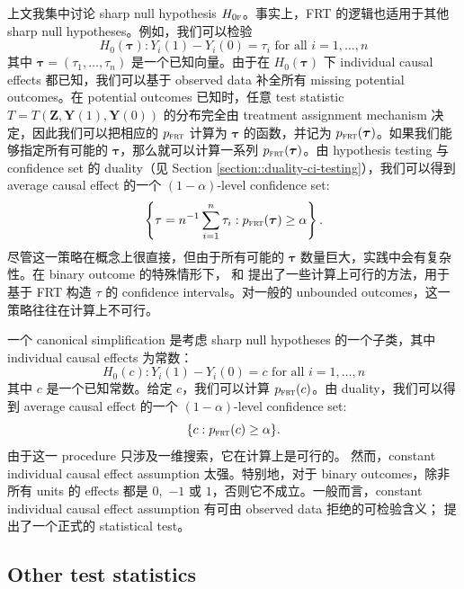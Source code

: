 上文我集中讨论 sharp null hypothesis $H_{0\textsc{f}}$。事实上，FRT 的逻辑也适用于其他 sharp null hypotheses。例如，我们可以检验
$$
H_0(\boldsymbol{\tau}): Y_i(1) - Y_i(0) = \tau_i \text{ for all } i=1,\ldots, n
$$
其中 $\boldsymbol{\tau} = (\tau_1, \ldots, \tau_n)$ 是一个已知向量。由于在 $H_0(\boldsymbol{\tau})$ 下 individual causal effects 都已知，我们可以基于 observed data 补全所有 missing potential outcomes。在 potential outcomes 已知时，任意 test statistic $T = T(\boldsymbol{Z}, \boldsymbol{Y}(1), \boldsymbol{Y}(0))$ 的分布完全由 treatment assignment mechanism 决定，因此我们可以把相应的 $p_{\textsc{frt}}$ 计算为 $\boldsymbol{\tau} $ 的函数，并记为 $p_{\textsc{frt}}(\boldsymbol{\tau} )$。如果我们能够指定所有可能的 $\boldsymbol{\tau}$，那么就可以计算一系列 $p_{\textsc{frt}}(\boldsymbol{\tau} )$。由 hypothesis testing 与 confidence set 的 duality（见 Section \ref{section::duality-ci-testing}），我们可以得到 average causal effect 的一个 $(1-\alpha)$-level confidence set:
$$
\left \{ \tau = n^{-1}\sum_{i=1}^n \tau_i :  p_{\textsc{frt}}(\boldsymbol{\tau} ) \geq \alpha \right \} .
$$
尽管这一策略在概念上很直接，但由于所有可能的 $\boldsymbol{\tau}$ 数量巨大，实践中会有复杂性。在 binary outcome 的特殊情形下，\citet{Rigdon:2015} 和 \citet{li2016exact} 提出了一些计算上可行的方法，用于基于 FRT 构造 $\tau$ 的 confidence intervals。对一般的 unbounded outcomes，这一策略往往在计算上不可行。


一个 canonical simplification \citep{rosenbaum2002design, Rosenbaum:2010} 是考虑 sharp null hypotheses 的一个子类，其中 individual causal effects 为常数：
$$
H_0(c): Y_i(1) - Y_i(0) =  c\text{ for all } i=1,\ldots, n
$$
其中 $c$ 是一个已知常数。给定 $c$，我们可以计算 $p_{\textsc{frt}}(c)$。由 duality，我们可以得到 average causal effect 的一个 $(1-\alpha)$-level confidence set:
$$
\{ c :  p_{\textsc{frt}}(c ) \geq \alpha \} .
$$
由于这一 procedure 只涉及一维搜索，它在计算上是可行的。
然而，constant individual causal effect assumption 太强。特别地，对于 binary outcomes，除非所有 units 的 effects 都是 $0,$ $-1$ 或 $1$，否则它不成立。一般而言，constant individual causal effect assumption 有可由 observed data 拒绝的可检验含义；\citet{ding2015randomization} 提出了一个正式的 statistical test。



\subsection{Other test statistics}\label{section::other-statistic}


